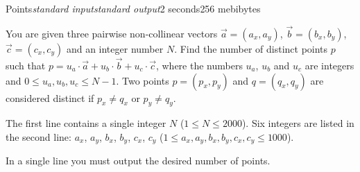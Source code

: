 \begin{problem}{Points}{\textsl{standard input}}{\textsl{standard output}}{2 seconds}{256 mebibytes}{}

You are given three pairwise non-collinear vectors $\vec{a} = (a_x, a_y)$, $\vec{b} = (b_x, b_y)$, $\vec{c} = (c_x, c_y)$ and an integer number $N$. Find the number of distinct points $p$ such that $p = u_a \cdot \vec{a} + u_b \cdot \vec{b} + u_c \cdot \vec{c}$, where the numbers $u_a$, $u_b$ and $u_c$ are integers and $0 \le u_a, u_b, u_c \le N - 1$. Two points $p = (p_x, p_y)$ and $q = (q_x, q_y)$ are considered distinct if $p_x \ne q_x$ or $p_y \ne q_y$.

\InputFile
The first line contains a single integer $N$ ($1 \le N \le 2000$). Six integers are listed in the second line: $a_x$, $a_y$, $b_x$, $b_y$, $c_x$, $c_y$ ($1 \le a_x, a_y, b_x, b_y, c_x, c_y \le 1000$).

\OutputFile
In a single line you must output the desired number of points.

\Examples

\begin{example}
%
%
%
\end{example}

\end{problem}
